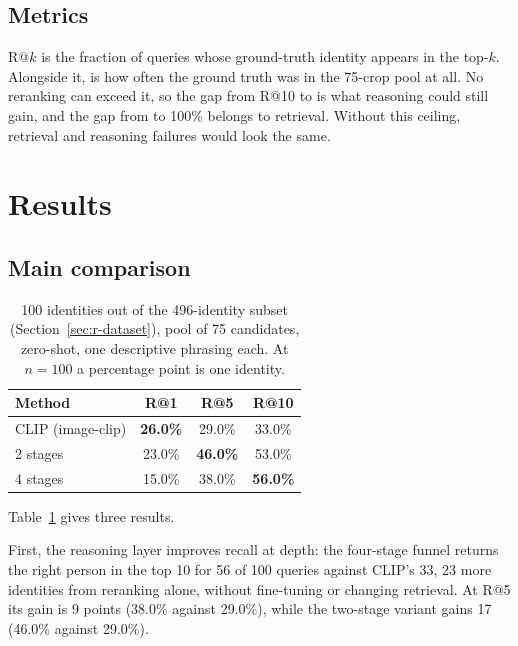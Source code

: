 \subsection{Metrics}
\label{sec:r-metrics}
R@$k$ is the fraction of queries whose ground-truth identity appears in the
top-$k$. Alongside it,  is how often the ground truth was in the
75-crop pool at all. No reranking can exceed it, so the gap from R@10 to
 is what reasoning could still gain, and the gap from  to
100\% belongs to retrieval. Without this ceiling, retrieval and reasoning failures
would look the same.

\section{Results}

\subsection{Main comparison}

\begin{table}[H]
\centering
\begin{tabular}{@{}lccc@{}}
\toprule
\textbf{Method} & \textbf{R@1} & \textbf{R@5} & \textbf{R@10}\\
\midrule
CLIP (image-clip)   & \textbf{26.0\%} & 29.0\%          & 33.0\%\\
2 stages            & 23.0\%          & \textbf{46.0\%} & 53.0\%\\
4 stages            & 15.0\%          & 38.0\%          & \textbf{56.0\%}\\
\bottomrule
\end{tabular}
\caption[Main comparison on 100 identities]{100 identities out of the 496-identity subset
(Section~\ref{sec:r-dataset}), pool of 75 candidates, zero-shot, one descriptive
phrasing each. At $n=100$ a percentage point is one identity.}
\label{tab:r-main}
\end{table}

Table~\ref{tab:r-main} gives three results.

First, the reasoning layer improves recall at depth: the four-stage funnel returns
the right person in the top 10 for 56 of 100 queries against CLIP's 33, 23 more
identities from reranking alone, without fine-tuning or changing retrieval. At R@5
its gain is 9 points (38.0\% against 29.0\%), while the two-stage variant gains 17
(46.0\% against 29.0\%).

